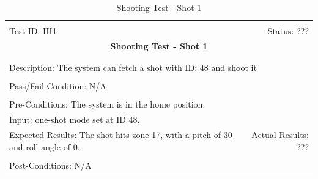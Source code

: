 \documentclass[11pt]{article}
\begin{document}
\begin{center}
\begin{table}[H]
\begin{tabular}{|l r|}\hline&\\[-2mm]
	Test ID: HI1	&Status: ???\\[-3mm]
	\multicolumn{2}{|c|}{\textbf{\large{Shooting Test - Shot 1}}}\\&\\\hline&\\[-3mm]
	\multicolumn{2}{|p{\textwidth}|}{Description: The system can fetch a shot with ID: 48 and shoot it}\\[1mm]\hline&\\[-3mm]
	\multicolumn{2}{|p{\textwidth}|}{Pass/Fail Condition: N/A}\\[1mm]\hline&\\[-3mm]
	\multicolumn{2}{|p{\textwidth}|}{Pre-Conditions: The system is in the home position.}\\[4mm]
	\multicolumn{2}{|p{\textwidth}|}{Input: one-shot mode set at ID 48.}\\[2mm]\hline
	\multicolumn{1}{|p{0.49\textwidth}}{Expected Results: The shot hits zone 17, with a pitch of 30 and roll angle of 0.}	&\multicolumn{1}{|p{0.45\textwidth}|}{Actual Results: ???}\\\hline&\\[-3mm]
	\multicolumn{2}{|p{\textwidth}|}{Post-Conditions: N/A}\\\hline
\end{tabular}
\caption{Shooting Test - Shot 1}
\end{table}
\end{center}
\end{document}
